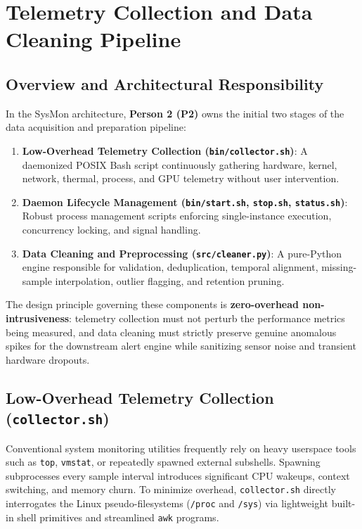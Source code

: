 \section{Telemetry Collection and Data Cleaning Pipeline}
\label{sec:collector_cleaner}

\subsection{Overview and Architectural Responsibility}
In the SysMon architecture, \textbf{Person 2 (P2)} owns the initial two stages of the data acquisition and preparation pipeline:
\begin{enumerate}
    \item \textbf{Low-Overhead Telemetry Collection (\texttt{bin/collector.sh})}: A daemonized POSIX Bash script continuously gathering hardware, kernel, network, thermal, process, and GPU telemetry without user intervention.
    \item \textbf{Daemon Lifecycle Management (\texttt{bin/start.sh}, \texttt{stop.sh}, \texttt{status.sh})}: Robust process management scripts enforcing single-instance execution, concurrency locking, and signal handling.
    \item \textbf{Data Cleaning and Preprocessing (\texttt{src/cleaner.py})}: A pure-Python engine responsible for validation, deduplication, temporal alignment, missing-sample interpolation, outlier flagging, and retention pruning.
\end{enumerate}

The design principle governing these components is \textbf{zero-overhead non-intrusiveness}: telemetry collection must not perturb the performance metrics being measured, and data cleaning must strictly preserve genuine anomalous spikes for the downstream alert engine while sanitizing sensor noise and transient hardware dropouts.

\subsection{Low-Overhead Telemetry Collection (\texttt{collector.sh})}
Conventional system monitoring utilities frequently rely on heavy userspace tools such as \texttt{top}, \texttt{vmstat}, or repeatedly spawned external subshells. Spawning subprocesses every sample interval introduces significant CPU wakeups, context switching, and memory churn. To minimize overhead, \texttt{collector.sh} directly interrogates the Linux pseudo-filesystems (\texttt{/proc} and \texttt{/sys}) via lightweight built-in shell primitives and streamlined \texttt{awk} programs.

